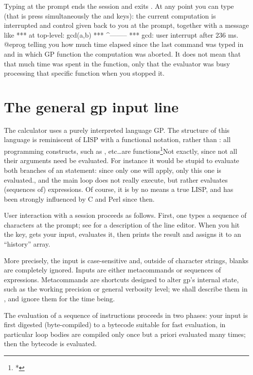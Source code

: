 
Typing  at the prompt ends the session and exits . At any
point you can type  (that is press simultaneously the
 and  keys): the current computation is interrupted and
control given back to you at the  prompt, together with a message
like
\bprog
  ***   at top-level: gcd(a,b)
  ***                 ^--------
  *** gcd: user interrupt after 236 ms.
@eprog\noindent
telling you how much time elapsed since the last command was typed in and
in which GP function the computation was aborted. It does not mean that that
much time was spent in the function, only that the evaluator was busy
processing that specific function when you stopped it.

\section{The general gp input line}

The  calculator uses a purely interpreted language GP. The structure
of this language is reminiscent of LISP with a functional notation,
 rather than : all programming constructs,
such as ,  etc\dots are functions\footnote{*}{Not exactly,
since not all their arguments need be evaluated. For instance it would be
stupid to evaluate both branches of an  statement: since only one
will apply, only this one is evaluated.}, and the main loop does not really
execute, but rather evaluates (sequences of) expressions. Of course, it is by
no means a true LISP, and has been strongly influenced by C and Perl since
then.

 User interaction with a  session proceeds as
follows. First, one types a sequence of characters at the  prompt;
see  for a description of the line editor. When you hit
the  key,  gets your input, evaluates it, then prints
the result and assigns it to an ``history'' array.

More precisely, the input is case-sensitive and, outside of character
strings, blanks are completely ignored. Inputs are either metacommands or
sequences of expressions. Metacommands are shortcuts designed to alter gp's
internal state, such as the working precision or general verbosity level; we
shall describe them in , and ignore them for the time being.

The evaluation of a sequence of instructions proceeds in two phases: your
input is first digested (byte-compiled) to a bytecode suitable for fast
evaluation, in particular loop bodies are compiled only once but a priori
evaluated many times; then the bytecode is evaluated.


